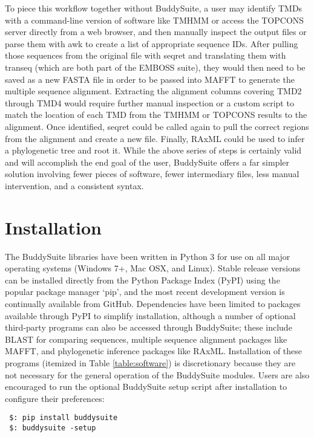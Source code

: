 \documentclass[nogrid]{MBE}%
\begin{document}
To piece this workflow together without BuddySuite, a user may identify TMDs with a command-line version of software like TMHMM \cite{Krogh:2001bv} or access the TOPCONS server directly from a web browser, and then manually inspect the output files or parse them with awk to create a list of appropriate sequence IDs. After pulling those sequences from the original file with seqret and translating them with transeq (which are both part of the EMBOSS suite), they would then need to be saved as a new FASTA file in order to be passed into MAFFT to generate the multiple sequence alignment. Extracting the alignment columns covering TMD2 through TMD4 would require further manual inspection or a custom script to match the location of each TMD from the TMHMM or TOPCONS results to the alignment. Once identified, seqret could be called again to pull the correct regions from the alignment and create a new file. Finally, RAxML \cite{Stamatakis:2006de} could be used to infer a phylogenetic tree and root it. While the above series of steps is certainly valid and will accomplish the end goal of the user, BuddySuite offers a far simpler solution involving fewer pieces of software, fewer intermediary files, less manual intervention, and a consistent syntax. 


\section{Installation}
The BuddySuite libraries have been written in Python 3 for use on all major operating systems (Windows 7+, Mac OSX, and Linux). Stable release versions can be installed directly from the Python Package Index (PyPI) using the popular package manager `pip', and the most recent development version is continually available from GitHub. Dependencies have been limited to packages available through PyPI to simplify installation, although a number of optional third-party programs can also be accessed through BuddySuite; these include BLAST \cite{Camacho2009} for comparing sequences, multiple sequence alignment packages like MAFFT, and phylogenetic inference packages like RAxML. Installation of these programs (itemized in Table \ref{table:software}) is discretionary because they are not necessary for the general operation of the BuddySuite modules. Users are also encouraged to run the optional BuddySuite setup script after installation to configure their preferences:

\smallskip
{\small
\begin{verbatim}
 $: pip install buddysuite
 $: buddysuite -setup
\end{verbatim}
}
\smallskip
\end{document}

